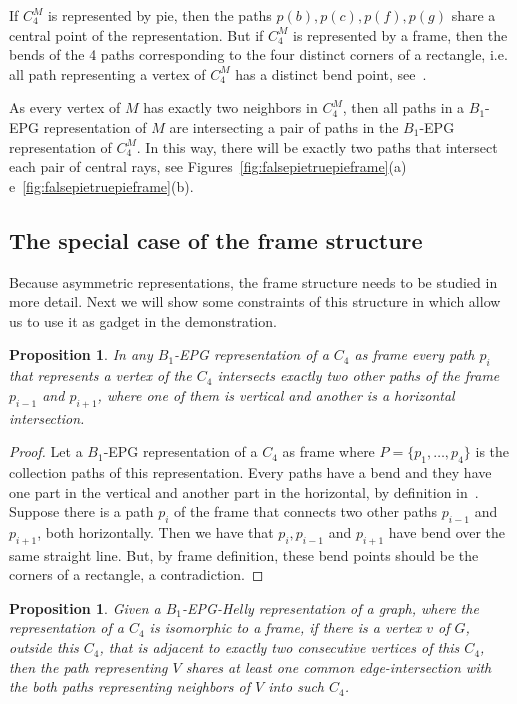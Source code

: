 \documentclass[a4paper,11pt]{article}
\newtheorem{prop}[theorem]{Proposition}
\begin{document}
If $C_4^M$ is represented by pie, then the paths $p(b), p(c), p(f), p(g)$ share a central point of the representation. But if $C_4^M$ is represented by a frame, then the bends of the 4 paths corresponding to the four distinct corners of a rectangle, i.e. all path representing a vertex of $C_4^M$ has a distinct bend point, see~\citep{golumbic2009}.

As every vertex of $M$ has exactly two neighbors in $C_4^M $, then all paths in a $B_1$-EPG representation of $M$ are intersecting a pair of paths in the $B_1$-EPG representation of $C_4^M$. In this way, there will be exactly two paths that intersect each pair of central rays, see Figures~\ref{fig:falsepietruepieframe}(a) e~\ref{fig:falsepietruepieframe}(b). 

\subsection{The special case of the frame structure} \label{subsec:moldura}

Because asymmetric representations, the frame structure needs to be studied in more detail. Next we will show some constraints of this structure in which allow us to use it as gadget in the demonstration.

\begin{prop}\label{lem:direcoesdiferentes}
In any $B_1$-EPG representation of a $C_4$ as frame every path $p_i$ that represents a vertex of the $C_4$ intersects exactly two other paths of the frame $p_{i-1}$ and $p_{i+1}$, where one of them is vertical and another is a horizontal intersection.
\end{prop}

\begin{proof}
Let a $B_1$-EPG representation of a $C_4$ as frame where $P = \{p_1, \dots, p_4\}$ is the collection paths of this representation.  Every paths have a bend and they have one part in the vertical and another part in the horizontal, by  definition in~\citep{golumbic2009}. Suppose there is a path $p_i$ of the frame that connects two other paths $p_{i-1} $ and $ p_{i + 1}$, both horizontally. Then we have that $p_i, p_{i-1}$ and $ p_{i + 1}$ have bend over the same straight line. But, by frame definition, these bend points should be the corners of a rectangle, a contradiction.
\end{proof}

\begin{prop}\label{lem:mesmaretasuporte}
Given a $B_1$-EPG-Helly representation of a graph, where the representation of a $C_4$ is isomorphic to a frame, if there is a vertex $v$ of $G$, outside this $C_4$, that is adjacent to exactly two consecutive vertices of this $C_4$, then the path representing $V$ shares at least one common edge-intersection with the both paths representing neighbors of $V$ into such $C_4$.  
\end{prop}
\end{document}
